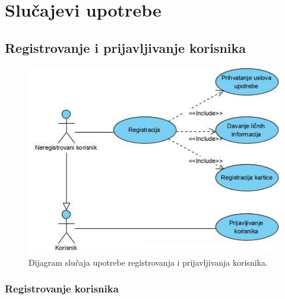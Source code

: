 \section{\bfseries Slučajevi upotrebe}

\subsection{\bfseries Registrovanje i prijavljivanje korisnika}
\begin{figure}[H]
\begin{center}
\includegraphics[scale=0.9]{Slike/UseCaseZaRegLog.jpg}
\end{center}
    \caption{Dijagram slučaja upotrebe registrovanja i prijavljivanja korisnika.}
\label{fig:RegistracijaPrijavljivanje}
\end{figure}


\subsubsection{\bfseries Registrovanje korisnika}

